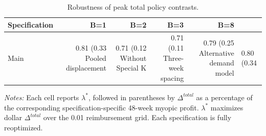 \begin{table}
\centering
\caption{Robustness of peak total policy contrasts.}
\label{tab:robustness_peaks}
\begin{tabular}{lrrrr}
\toprule
Specification & B=1 & B=2 & B=3 & B=8 \\
\midrule
Main & 0.81 (0.33%
Pooled displacement & 0.71 (0.12%
Without Special K & 0.71 (0.11%
Three-week spacing & 0.79 (0.25%
Alternative demand model & 0.80 (0.34%
\bottomrule
\end{tabular}
\smallskip
\footnotesize\emph{Notes:} Each cell reports $\lambda^*$, followed in parentheses by $\Delta^{total}$ as a percentage of the corresponding specification-specific 48-week myopic profit. $\lambda^*$ maximizes dollar $\Delta^{total}$ over the 0.01 reimbursement grid. Each specification is fully reoptimized.
\end{table}

